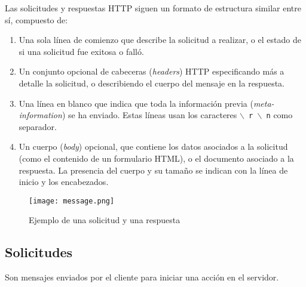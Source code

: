 \documentclass[15pt]{article}
\begin{document}
			Las solicitudes y respuestas HTTP siguen un formato de estructura similar entre sí, compuesto de:
			\begin{enumerate}
				\item Una sola línea de comienzo que describe la solicitud a realizar, o el estado de si una solicitud fue exitosa o falló.
				\item Un conjunto opcional de cabeceras (\emph{headers}) HTTP especificando más a detalle la solicitud, o describiendo el cuerpo del mensaje en la respuesta.
				\item Una línea en blanco que indica que toda la información previa (\emph{meta-information}) se ha enviado. Estas líneas usan los caracteres \texttt{$\backslash$ r $\backslash$ n} como separador.
				\item Un cuerpo (\emph{body}) opcional, que contiene los datos asociados a la solicitud (como el contenido de un formulario HTML), o el documento asociado a la respuesta. La presencia del cuerpo y su tamaño se indican con la línea de inicio y los encabezados.
			\end{enumerate}
			
			\begin{figure}[H]
				\centering
				\texttt{[image: message.png]}
				\caption{Ejemplo de una solicitud y una respuesta}
			\end{figure}
			
		\subsection{Solicitudes}
			Son mensajes enviados por el cliente para iniciar una acción en el servidor.
			
\end{document}
